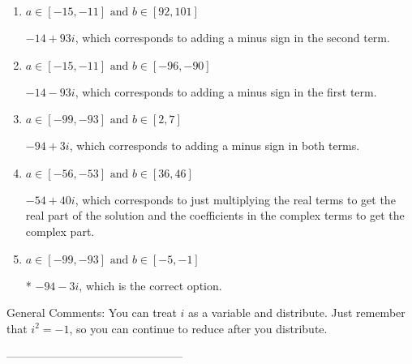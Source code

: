 \documentclass{article}[14pt]
\begin{document}
\begin{enumerate}[label=\Alph*.] 
\item $ a \in [-15, -11] \text{ and } b \in [92, 101] $ 

  $-14  + 93 i$, which corresponds to adding a minus sign in the second term. 
\item $ a \in [-15, -11] \text{ and } b \in [-96, -90] $ 

  $-14  - 93 i$, which corresponds to adding a minus sign in the first term. 
\item $ a \in [-99, -93] \text{ and } b \in [2, 7] $ 

  $-94  + 3 i$, which corresponds to adding a minus sign in both terms. 
\item $ a \in [-56, -53] \text{ and } b \in [36, 46] $ 

  $-54  + 40 i$, which corresponds to just multiplying the real terms to get the real part of the solution and the coefficients in the complex terms to get the complex part. 
\item $ a \in [-99, -93] \text{ and } b \in [-5, -1] $ 

 * $-94  - 3 i$, which is the correct option. 
\end{enumerate} 
 
General Comments: You can treat $i$ as a variable and distribute. Just remember that $i^2=-1$, so you can continue to reduce after you distribute.

-----------------------------------------------
\end{document}

